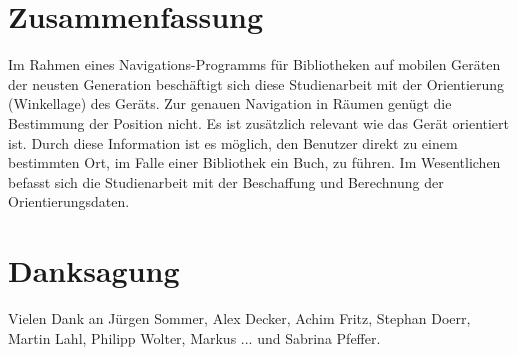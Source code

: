 \documentclass[twoside,12pt,a4paper]{report}
\begin{document}


\section*{Zusammenfassung}

Im Rahmen eines Navigations-Programms für Bibliotheken auf mobilen Geräten der neusten Generation beschäftigt sich diese Studienarbeit mit der Orientierung (Winkellage) des Geräts. Zur genauen Navigation in Räumen genügt die Bestimmung der Position nicht. Es ist zusätzlich relevant wie das Gerät orientiert ist. Durch diese Information ist es möglich, den Benutzer direkt zu einem bestimmten Ort, im Falle einer Bibliothek ein Buch, zu führen. Im Wesentlichen befasst sich die Studienarbeit mit der Beschaffung und Berechnung der Orientierungsdaten.

\newpage
\section*{Danksagung}

Vielen Dank an Jürgen Sommer, Alex Decker, Achim Fritz, Stephan Doerr, Martin Lahl, Philipp Wolter, Markus ... und Sabrina Pfeffer.

\cleardoublepage


\renewcommand{\baselinestretch}{1.3}
\small\normalsize

\tableofcontents

\renewcommand{\baselinestretch}{1}
\small\normalsize

\cleardoublepage


\renewcommand{\baselinestretch}{1.3}
\small\normalsize

\listoffigures

\renewcommand{\baselinestretch}{1}
\small\normalsize

\cleardoublepage
\end{document}
